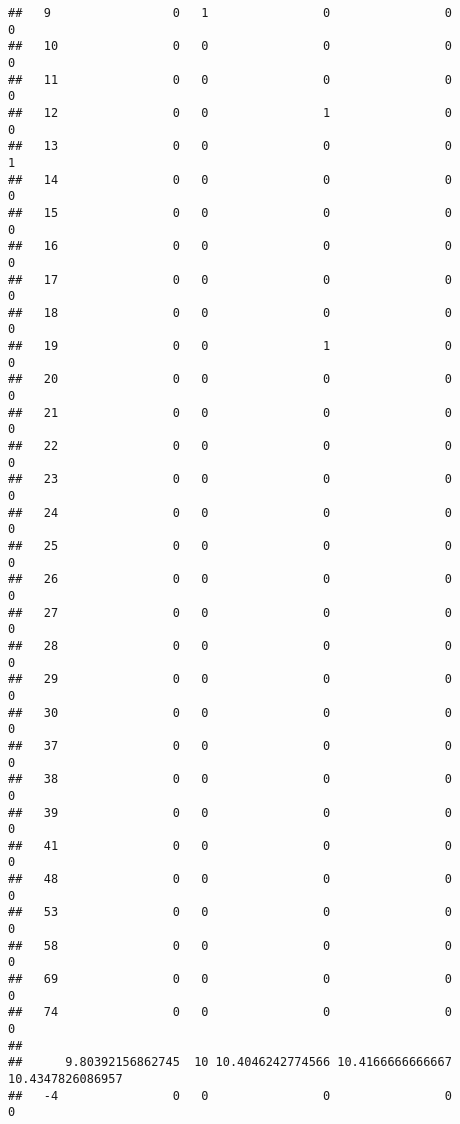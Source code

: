 \documentclass[]{article}
\begin{document}
\begin{verbatim}
##   9                 0   1                0                0                0
##   10                0   0                0                0                0
##   11                0   0                0                0                0
##   12                0   0                1                0                0
##   13                0   0                0                0                1
##   14                0   0                0                0                0
##   15                0   0                0                0                0
##   16                0   0                0                0                0
##   17                0   0                0                0                0
##   18                0   0                0                0                0
##   19                0   0                1                0                0
##   20                0   0                0                0                0
##   21                0   0                0                0                0
##   22                0   0                0                0                0
##   23                0   0                0                0                0
##   24                0   0                0                0                0
##   25                0   0                0                0                0
##   26                0   0                0                0                0
##   27                0   0                0                0                0
##   28                0   0                0                0                0
##   29                0   0                0                0                0
##   30                0   0                0                0                0
##   37                0   0                0                0                0
##   38                0   0                0                0                0
##   39                0   0                0                0                0
##   41                0   0                0                0                0
##   48                0   0                0                0                0
##   53                0   0                0                0                0
##   58                0   0                0                0                0
##   69                0   0                0                0                0
##   74                0   0                0                0                0
##     
##      9.80392156862745  10 10.4046242774566 10.4166666666667 10.4347826086957
##   -4                0   0                0                0                0

\end{verbatim}
\end{document}
